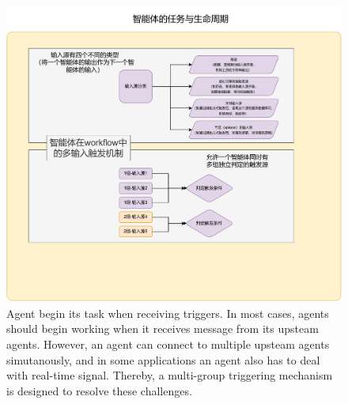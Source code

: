 \documentclass[lettersize,journal]{IEEEtran}
\begin{document}
\begin{figure}[ht]
  \centering
  \includegraphics[width=0.9\linewidth]{drawio/agent_trigger.drawio.pdf}
  \caption{Agent begin its task when receiving triggers. In most cases, agents should begin working when it receives message from its upsteam agents. However, an agent can connect to multiple upsteam agents simutanously, and in some applications an agent also has to deal with real-time signal. Thereby, a multi-group triggering mechanism is designed to resolve these challenges.}
  \label{fig:agent_trigger}
  \end{figure}





{\footnotesize
}




\vfill
\end{document}
